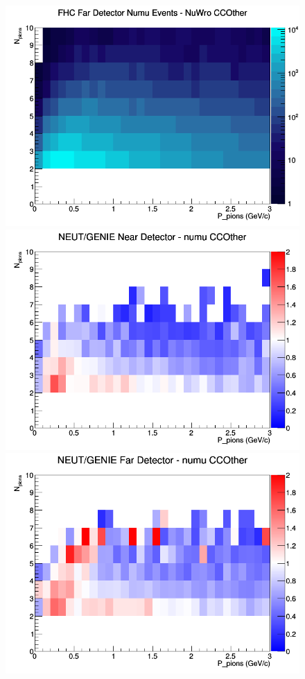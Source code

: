 \documentclass[12pt]{article}
\begin{document}
\begin{figure}[h]
\endminipage
{}
\includegraphics[width=\linewidth]{N_P/nominal/pions/CCOther_FHC_FD_numu_N_P_NuWro.png}
\endminipage
\newline
{}
\includegraphics[width=\linewidth]{N_P/nominal/pions/ratios/CCOther_NEUT_GENIE_numu_near_N_P.png}
\endminipage
{}
\includegraphics[width=\linewidth]{N_P/nominal/pions/ratios/CCOther_NEUT_GENIE_numu_far_N_P.png}

\end{figure}
\end{document}

